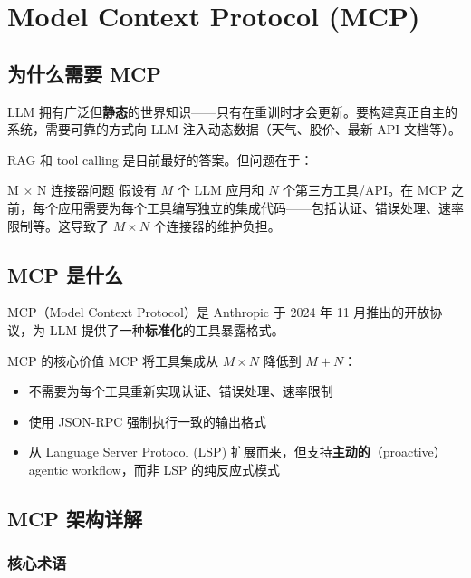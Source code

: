 \section{Model Context Protocol (MCP)}

\subsection{为什么需要 MCP}

LLM 拥有广泛但\textbf{静态}的世界知识——只有在重训时才会更新。要构建真正自主的系统，需要可靠的方式向 LLM 注入动态数据（天气、股价、最新 API 文档等）。

RAG 和 tool calling 是目前最好的答案。但问题在于：

\begin{knowledgebox}{M $\times$ N 连接器问题}
假设有 $M$ 个 LLM 应用和 $N$ 个第三方工具/API。在 MCP 之前，每个应用需要为每个工具编写独立的集成代码——包括认证、错误处理、速率限制等。这导致了 $M \times N$ 个连接器的维护负担。
\end{knowledgebox}

\subsection{MCP 是什么}

MCP（Model Context Protocol）是 Anthropic 于 2024 年 11 月推出的开放协议，为 LLM 提供了一种\textbf{标准化}的工具暴露格式。

\begin{importantbox}{MCP 的核心价值}
MCP 将工具集成从 $M \times N$ 降低到 $M + N$：
\begin{itemize}
    \item 不需要为每个工具重新实现认证、错误处理、速率限制
    \item 使用 JSON-RPC 强制执行一致的输出格式
    \item 从 Language Server Protocol (LSP) 扩展而来，但支持\textbf{主动的}（proactive）agentic workflow，而非 LSP 的纯反应式模式
\end{itemize}
\end{importantbox}

\subsection{MCP 架构详解}

\subsubsection{核心术语}

